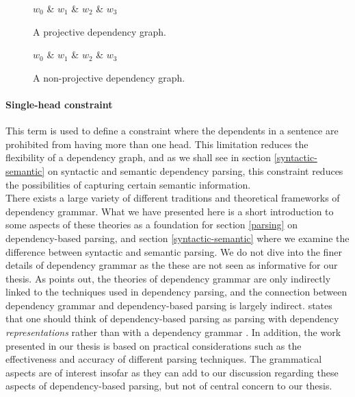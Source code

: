 \begin{figure}
    \centering
    \begin{dependency}
        \begin{deptext}[column sep=1em, row sep=.1ex]
        $w_0$ \& $w_1$ \& $w_2$ \& $w_3$ \\
        \end{deptext}
    \end{dependency}
    \caption{A projective dependency graph.}
    \label{projective}
\end{figure}

\begin{figure}
    \centering
    \begin{dependency}
        \begin{deptext}[column sep=1em, row sep=.1ex]
        $w_0$ \& $w_1$ \& $w_2$ \& $w_3$ \\    
        \end{deptext}
    \end{dependency}
    \caption{A non-projective dependency graph.}
    \label{non-projective}
\end{figure}

\paragraph{Single-head constraint} This term is used to define a constraint where the dependents in a sentence are prohibited from having more than one head. This limitation reduces the flexibility of a dependency graph, and as we shall see in section \ref{syntactic-semantic} on syntactic and semantic dependency parsing, this constraint reduces the possibilities of capturing certain semantic information.\\

There exists a large variety of different traditions and theoretical frameworks of dependency grammar. What we have presented here is a short introduction to some aspects of these theories as a foundation for section \ref{parsing} on dependency-based parsing, and section \ref{syntactic-semantic} where we examine the difference between syntactic and semantic parsing. We do not dive into the finer details of dependency grammar as the these are not seen as informative for our thesis. As \citeauthor{Niv:05} points out, the theories of dependency grammar are only indirectly linked to the techniques used in dependency parsing, and the connection between dependency grammar and dependency-based parsing is largely indirect. \citeauthor{Niv:05} states that one should think of dependency-based parsing as parsing with dependency \textit{representations} rather than with a dependency grammar \cite{Niv:05}. In addition, the work presented in our thesis is based on practical considerations such as the effectiveness and accuracy of different parsing techniques. The grammatical aspects are of interest insofar as they can add to our discussion regarding these aspects of dependency-based parsing, but not of central concern to our thesis.


